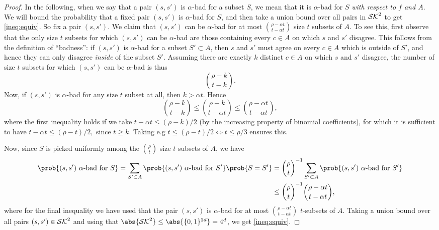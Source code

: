 \begin{proof}
  In the following, when we say that a pair \((s,s')\) is \(\alpha\)-bad for a subset \(S\),
  we mean that it is \(\alpha\)-bad for \(S\) \emph{with respect to \(f\) and \(A\)}.
  We will bound the probability that a fixed pair \((s,s')\) is \(\alpha\)-bad for \(S\),
  and then take a union bound over all pairs in \(\mathcal{SK}^{2}\) to get \eqref{ineq:equiv}.
  So fix a pair \((s,s')\).
  We claim that \((s,s')\) can be \(\alpha\)-bad for at most \(\binom{\rho - \alpha t}{t - \alpha t}\) size \(t\) subsets of \(A\).
  To see this, first observe that the only size \(t\) subsets for which \((s, s')\) can be \(\alpha\)-bad
  are those containing every \(c \in A\) on which \(s\) and \(s'\) disagree.
  This follows from the definition of ``badness'':
  if \((s,s')\) is \(\alpha\)-bad for a subset \(S' \subset A\),
  then \(s\) and \(s'\) must agree on every \(c \in A\) which is outside of \(S'\),
  and hence they can only disagree \emph{inside} of the subset \(S'\).
  Assuming there are exactly \(k\) distinct \(c \in A\) on which \(s\) and \(s'\) disagree,
  the number of size \(t\) subsets for which \((s, s')\) can be \(\alpha\)-bad is thus
  \[
    \binom{\rho - k}{t - k}.
  \]
  Now, if \((s, s')\) is \(\alpha\)-bad for any size \(t\) subset at all, then \(k > \alpha t\). Hence
  \[
    \binom{\rho - k}{t - k} \le \binom{\rho - k}{t - \alpha t} \le \binom{\rho - \alpha t}{t - \alpha t},
  \]
  where the first inequality holds if we take
  \(
    t - \alpha t \le (\rho - k)/2
  \)
  (by the increasing property of binomial coefficients),
  for which it is sufficient to have
  \(
    t - \alpha t \le (\rho - t)/2,
  \)
  since \(t \ge k\).
  Taking e.g \(t \le (\rho - t)/2 \iff t \le \rho / 3\) ensures this.

  Now, since \(S\) is picked uniformly among the \(\binom{\rho}{t}\) size \(t\) subsets
  of \(A\), we have
  \begin{align}
    \prob{(s,s') \text{ \(\alpha\)-bad for } S} = \sum_{S' \subset A}{\prob{(s, s') \text{ \(\alpha\)-bad for } S'}\prob{S = S'}}
    & = {\binom{\rho}{t}}^{-1} \sum_{S' \subset A}{\prob{(s, s') \text{ \(\alpha\)-bad for } S'}}\notag\\
    & \le {\binom{\rho}{t}}^{-1} \binom{\rho - \alpha t}{t - \alpha t}, \notag
  \end{align}
  where for the final inequality we have used that the pair \((s, s')\) is
  \(\alpha\)-bad for at most \(\binom{\rho - \alpha t}{t - \alpha t}\) \(t\)-subsets of \(A\).
  Taking a union bound over all pairs \((s,s') \in \mathcal{SK}^{2}\) and using that \(\abs{\setSK^{2}} \le \abs{\{0,1\}^{2d}} = 4^{d}\),
  we get \eqref{ineq:equiv}.
\end{proof}

